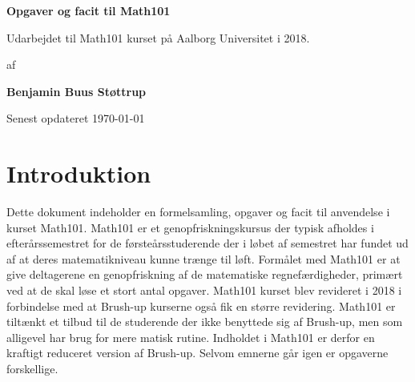 



\author{Benjamin Buus Støttrup}

\pagestyle{plain}
\begin{titlepage}
    \begin{center}
        \vspace*{1cm}
        \Huge
        \textbf{Opgaver og facit til Math101}

        \vspace{0.5cm}
        \large
        Udarbejdet til Math101 kurset på Aalborg Universitet i 2018.
        \vspace{1.5cm}

        af

        \vspace{1.5cm}
        \textbf{Benjamin Buus Støttrup}

        \vfill
        Senest opdateret \today
        \vspace{2cm}




    \end{center}
    \doclicenseThis
 \end{titlepage}



\tableofcontents
\chapter*{Introduktion}\normalsize
Dette dokument indeholder en formelsamling, opgaver og facit til anvendelse i kurset Math101. Math101 er et genopfriskningskursus der typisk afholdes i efterårssemestret for de førsteårsstuderende der i løbet af semestret har fundet ud af at deres matematikniveau kunne trænge til løft. Formålet med Math101 er at give deltagerene en genopfriskning af de matematiske regnefærdigheder, primært ved at de skal løse et stort antal opgaver. Math101 kurset blev revideret i 2018 i forbindelse med at Brush-up kurserne også fik en større revidering. Math101 er tiltænkt et tilbud til de studerende der ikke benyttede sig af Brush-up, men som alligevel har brug for mere matisk rutine. Indholdet i Math101 er derfor en kraftigt reduceret version af Brush-up. Selvom emnerne går igen er opgaverne forskellige.

